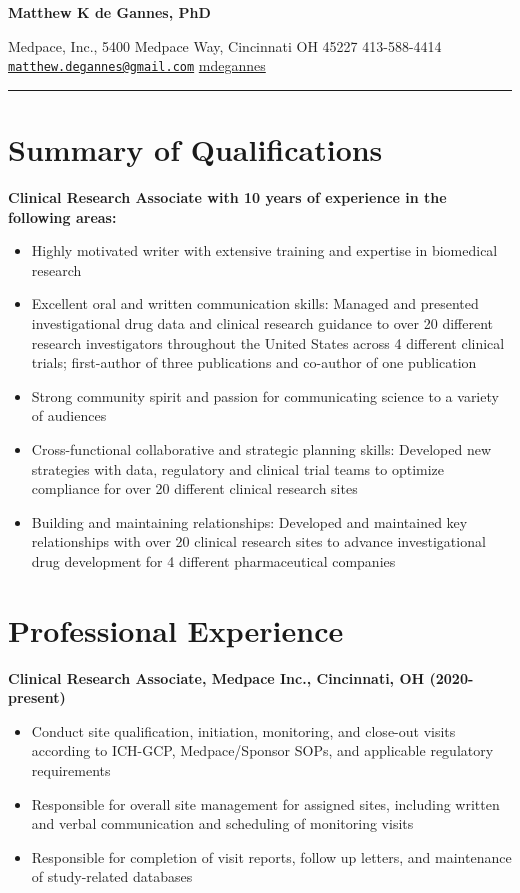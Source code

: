 \documentclass[10pt,a4paper,]{article}
\date{April 2024}
\makeatletter
\providecommand{\tightlist}{%
  \setlength{\itemsep}{0pt}\setlength{\parskip}{0pt}}
\def\maketitle{
\vspace*{-1.4cm}
\thispagestyle{empty}
\centerline{\huge \bf Matthew K de Gannes, PhD}


\vspace{1 mm}
\centerline{
\faicon{map-marker} Medpace, Inc., 5400 Medpace Way, Cincinnati OH
45227 \hspace{1 mm} %
%
%
\faicon{phone} 413-588-4414 \hspace{1 mm} %
\faicon{envelope} \href{mailto:}{\color{black} \href{mailto:matthew.degannes@gmail.com}{\nolinkurl{matthew.degannes@gmail.com}}} \hspace{1 mm} %
\faicon{linkedin} \href{https://www.linkedin.com/in/mdegannes}{mdegannes} \hspace{1 mm} %
%
%
%
}

\vspace{2 mm}
\hrule
}
\makeatother
\begin{document}
\maketitle


\section{Summary of Qualifications}\label{summary-of-qualifications}

\textbf{Clinical Research Associate with 10 years of experience in the
following areas:}

\begin{itemize}
\tightlist
\item
  Highly motivated writer with extensive training and expertise in
  biomedical research
\item
  Excellent oral and written communication skills: Managed and presented
  investigational drug data and clinical research guidance to over 20
  different research investigators throughout the United States across 4
  different clinical trials; first-author of three publications and
  co-author of one publication
\item
  Strong community spirit and passion for communicating science to a
  variety of audiences
\item
  Cross-functional collaborative and strategic planning skills:
  Developed new strategies with data, regulatory and clinical trial
  teams to optimize compliance for over 20 different clinical research
  sites
\item
  Building and maintaining relationships: Developed and maintained key
  relationships with over 20 clinical research sites to advance
  investigational drug development for 4 different pharmaceutical
  companies
\end{itemize}

\section{Professional Experience}\label{professional-experience}

\textbf{Clinical Research Associate, Medpace Inc., Cincinnati, OH
(2020-present)}

\begin{itemize}
\tightlist
\item
  Conduct site qualification, initiation, monitoring, and close-out
  visits according to ICH-GCP, Medpace/Sponsor SOPs, and applicable
  regulatory requirements
\item
  Responsible for overall site management for assigned sites, including
  written and verbal communication and scheduling of monitoring visits
\item
  Responsible for completion of visit reports, follow up letters, and
  maintenance of study-related databases
\end{itemize}
\end{document}
